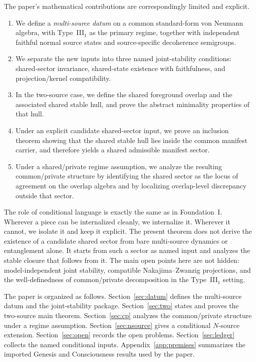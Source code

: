 \documentclass[12pt]{article}
\theoremstyle{definition}
\theoremstyle{remark}
\begin{document}
The paper's mathematical contributions are correspondingly limited and
explicit.
\begin{enumerate}
\item We define a \emph{multi-source datum} on a common standard-form
  von Neumann algebra, with Type~III\(_1\) as the primary regime,
  together with independent faithful normal source states and
  source-specific decoherence semigroups.
\item We separate the new inputs into three named
  joint-stability conditions: shared-sector invariance,
  shared-state existence with faithfulness, and projection/kernel
  compatibility.
\item In the two-source case, we define the shared foreground overlap
  and the associated shared stable hull, and prove the abstract
  minimality properties of that hull.
\item Under an explicit candidate shared-sector input, we prove an
  inclusion theorem showing that the shared stable hull lies inside the
  common manifest carrier, and therefore yields a shared admissible
  manifest sector.
\item Under a shared/private regime assumption, we analyze the resulting
  common/private structure by identifying the shared sector as the locus
  of agreement on the overlap algebra and by localizing overlap-level
  discrepancy outside that sector.
\end{enumerate}

The role of conditional language is exactly the same as in
Foundation~I. Wherever a piece can be internalized cleanly, we
internalize it. Wherever it cannot, we isolate it and keep it explicit.
The present theorem does not derive the existence of a candidate shared
sector from bare multi-source dynamics or entanglement alone. It starts
from such a sector as named input and analyzes the stable closure that
follows from it.
The main open points here are not hidden: model-independent joint
stability, compatible Nakajima--Zwanzig projections, and the
well-definedness of common/private decomposition in the Type~III\(_1\)
setting.

The paper is organized as follows. Section~\ref{sec:datum} defines the
multi-source datum and the joint-stability package. Section~\ref{sec:two}
states and proves the two-source main theorem. Section~\ref{sec:cp}
analyzes the common/private structure under a regime assumption.
Section~\ref{sec:nsource} gives a conditional \(N\)-source extension.
Section~\ref{sec:open} records the open problems. Section~\ref{sec:ledger}
collects the named conditional inputs. Appendix~\ref{app:premises}
summarizes the imported Genesis and Consciousness results used by the
paper.
\end{document}
